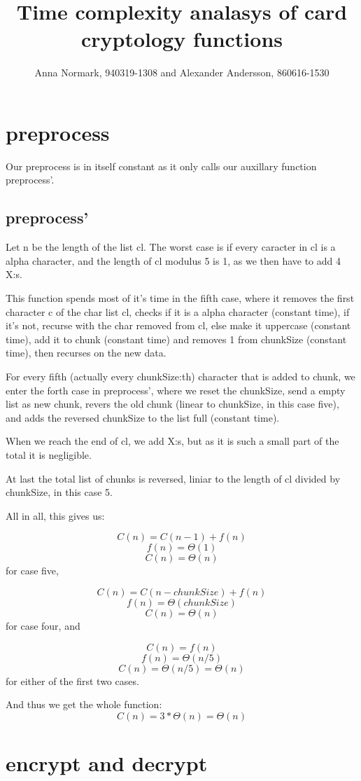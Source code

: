 \documentclass[12pt, a4paper]{article}
\title{Time complexity analasys of card cryptology functions}
\author{Anna Normark, 940319-1308 and Alexander Andersson, 860616-1530}
\begin{document}
\maketitle



\section{preprocess}
Our preprocess is in itself constant as it only calls our auxillary function preprocess'.
\subsection{preprocess'}
Let n be the length of the list cl. The worst case is if every caracter in cl is a alpha character, and the length of cl modulus 5 is 1, as we then have to add 4 X:s.

This function spends most of it's time in the fifth case, where it removes the first character c of the char list cl, checks if it is a alpha character (constant time), if it's not, recurse with the char removed from cl, else make it uppercase (constant time), add it to chunk (constant time) and removes 1 from chunkSize (constant time), then recurses on the new data.

For every fifth (actually every chunkSize:th) character that is added to chunk, we enter the forth case in preprocess', where we reset the chunkSize, send a empty list as new chunk, revers the old chunk (linear to chunkSize, in this case five), and adds the reversed chunkSize to the list full (constant time).

When we reach the end of cl, we add X:s, but as it is such a small part of the total it is negligible.

At last the total list of chunks is reversed, liniar to the length of cl divided by chunkSize, in this case 5.

All in all, this gives us:

$$C(n) = C(n-1) + f(n)$$
$$f(n) = \Theta(1)$$
$$C(n) = \Theta(n)$$ for case five,


$$C(n) = C(n - chunkSize) + f(n)$$
$$f(n) = \Theta(chunkSize)$$
$$C(n) = \Theta(n)$$ for case four, and

$$C(n) = f(n)$$
$$f(n) = \Theta(n/5)$$
$$C(n) = \Theta(n/5) = \Theta(n)$$ for either of the first two cases.

And thus we get the whole function:
$$C(n) = 3 * \Theta(n) = \Theta(n)$$

\section{encrypt and decrypt}
\end{document}
